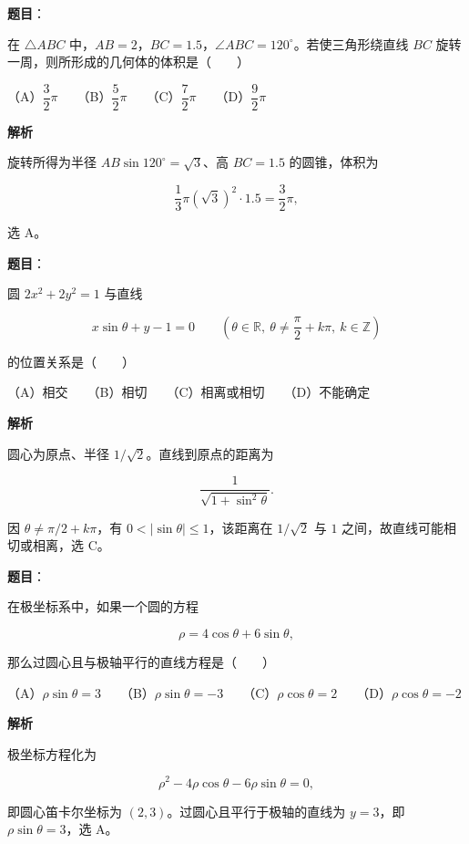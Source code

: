 \begin{answer}

\textbf{题目}：

在 $\triangle ABC$ 中，$AB=2$，$BC=1.5$，$\angle ABC=120^\circ$。若使三角形绕直线 $BC$ 旋转一周，则所形成的几何体的体积是\mbox{（　　）}

（A）$\dfrac32\pi$　　（B）$\dfrac52\pi$　　（C）$\dfrac72\pi$　　（D）$\dfrac92\pi$

\textbf{解析}

旋转所得为半径 $AB\sin120^\circ=\sqrt3$、高 $BC=1.5$ 的圆锥，体积为

\nopagebreak[4]
\[
\frac13\pi(\sqrt3)^2\cdot1.5=\frac32\pi,
\]

选 A。


\end{answer}
\begin{answer}

\textbf{题目}：

圆 $2x^2+2y^2=1$ 与直线

\nopagebreak[4]
\[
x\sin\theta+y-1=0
\qquad\left(\theta\in\mathbb R,\ \theta\ne\frac\pi2+k\pi,\ k\in\mathbb Z\right)
\]

的位置关系是\mbox{（　　）}

（A）相交　　（B）相切　　（C）相离或相切　　（D）不能确定

\textbf{解析}

圆心为原点、半径 $1/\sqrt2$。直线到原点的距离为

\nopagebreak[4]
\[
\frac1{\sqrt{1+\sin^2\theta}}.
\]

因 $\theta\ne\pi/2+k\pi$，有 $0<|\sin\theta|\le1$，该距离在 $1/\sqrt2$ 与 $1$ 之间，故直线可能相切或相离，选 C。


\end{answer}
\begin{answer}

\textbf{题目}：

在极坐标系中，如果一个圆的方程

\nopagebreak[4]
\[
\rho=4\cos\theta+6\sin\theta,
\]

那么过圆心且与极轴平行的直线方程是\mbox{（　　）}

（A）$\rho\sin\theta=3$　　（B）$\rho\sin\theta=-3$　　（C）$\rho\cos\theta=2$　　（D）$\rho\cos\theta=-2$

\textbf{解析}

极坐标方程化为

\nopagebreak[4]
\[
\rho^2-4\rho\cos\theta-6\rho\sin\theta=0,
\]

即圆心笛卡尔坐标为 $(2,3)$。过圆心且平行于极轴的直线为 $y=3$，即 $\rho\sin\theta=3$，选 A。


\end{answer}

